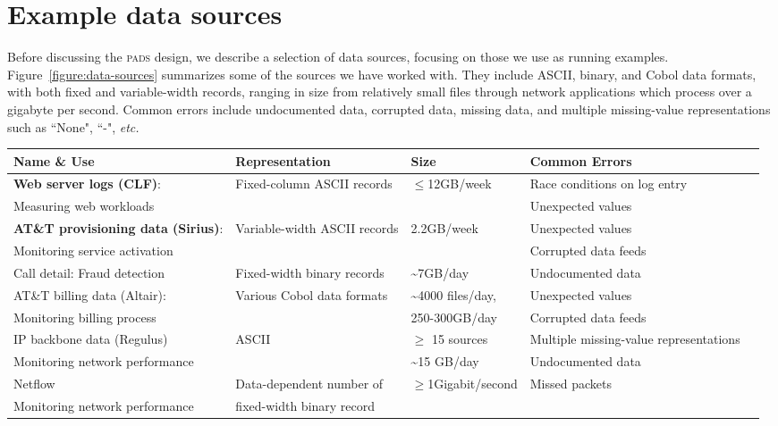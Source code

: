 \documentclass{sigplanconf}
\newcommand{\dibbler}{Sirius}
\newcommand{\ningaui}{Altair}
\newcommand{\darkstar}{Regulus}
\newcommand{\figref}[1]{Figure~\ref{#1}}
\newcommand{\etc}{{\em etc.\/}}
\newcommand{\appr}{\~{}}
\newcommand{\pads}{\textsc{pads}}
\begin{document}
\section{Example data sources}

Before discussing the \pads{} design, we describe a selection of data
sources, focusing on those we use as running examples.
\figref{figure:data-sources} summarizes some of the sources we have
worked with.  They include ASCII, binary, and Cobol data formats, with
both fixed and variable-width records, ranging in size from
relatively small files through network applications which process over
a gigabyte per second.  Common errors include undocumented data,
corrupted data, missing data, and multiple missing-value
representations such as ``None", ``-", \etc{}

\begin{figure*}
\begin{center}
\begin{tabular}{|l|l|l|l|l|}
\hline
Name \& Use   &  Representation              &Size           & Common Errors \\ \hline\hline
\textbf{Web server logs (CLF)}: &  Fixed-column ASCII records & $\leq$12GB/week & Race conditions on log entry\\ 
Measuring web workloads                   &                             &                             & Unexpected values\\ \hline
\textbf{AT\&T provisioning data (\dibbler{})}: & Variable-width ASCII records & 2.2GB/week & Unexpected values \\ 
Monitoring service activation &                              &            & Corrupted data feeds \\ \hline
Call detail: Fraud detection  &  Fixed-width binary records  &\appr{}7GB/day &  Undocumented data\\  \hline 
AT\&T billing data (\ningaui{}): & Various Cobol data formats  & \appr{}4000 files/day, & Unexpected values\\ 
Monitoring billing process   &                             & 250-300GB/day    & Corrupted data feeds \\ \hline
IP backbone data (\darkstar{})  & ASCII  & $\ge$ 15 sources  & Multiple missing-value representations \\
Monitoring network performance  &        & \appr{}15 GB/day              & Undocumented data \\ \hline
Netflow       & Data-dependent number of     & $\ge$1Gigabit/second  & Missed packets\\ 
Monitoring network performance              &  fixed-width binary record   &                       & \\ \hline

\end{tabular}
\caption{Selected ad hoc data sources.  We will use the \textbf{bold} data sources in our examples. }
\label{figure:data-sources}
\end{center}
\end{figure*}
\end{document}
